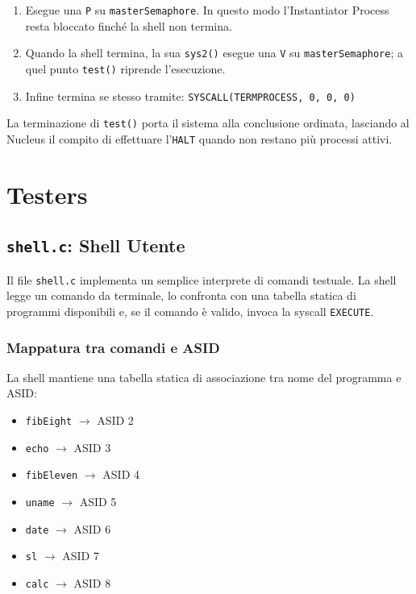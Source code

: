 \documentclass[a4paper,12pt]{article}
\begin{document}
\begin{enumerate}
\begin{enumerate}
    \item Esegue una \texttt{P} su \texttt{masterSemaphore}. In questo modo l'Instantiator Process resta bloccato finché la shell non termina.

    \item Quando la shell termina, la sua \texttt{sys2()} esegue una \texttt{V} su \texttt{masterSemaphore}; a quel punto \texttt{test()} riprende l'esecuzione.

    \item Infine termina se stesso tramite:
        \texttt{SYSCALL(TERMPROCESS, 0, 0, 0)}

\end{enumerate}

La terminazione di \texttt{test()} porta il sistema alla conclusione ordinata, lasciando al Nucleus il compito di effettuare l'\texttt{HALT} quando non restano più processi attivi.
\section{Testers}
\vspace{0.5cm}
\subsection{\texttt{shell.c}: Shell Utente}

Il file \texttt{shell.c} implementa un semplice interprete di comandi testuale. La shell legge un comando da terminale, lo confronta con una tabella statica di programmi disponibili e, se il comando è valido, invoca la syscall \texttt{EXECUTE}.

\vspace{0.3cm}
\subsubsection{Mappatura tra comandi e ASID}

La shell mantiene una tabella statica di associazione tra nome del programma e ASID:

\begin{itemize}
    \item \texttt{fibEight} $\rightarrow$ ASID 2
    \item \texttt{echo} $\rightarrow$ ASID 3
    \item \texttt{fibEleven} $\rightarrow$ ASID 4
    \item \texttt{uname} $\rightarrow$ ASID 5
    \item \texttt{date} $\rightarrow$ ASID 6
    \item \texttt{sl} $\rightarrow$ ASID 7
    \item \texttt{calc} $\rightarrow$ ASID 8
\end{itemize}


\end{enumerate}
\end{document}
